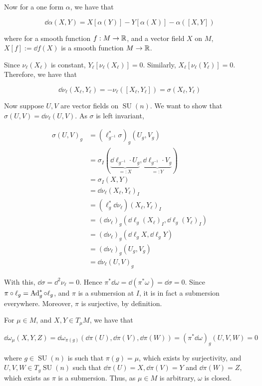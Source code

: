 \documentclass{article}
\DeclareMathOperator{\SU}{SU}
\begin{document}
Now for a one form \(\alpha\), we have that

\[\dd\alpha(X, Y) = X[\alpha(Y)] - Y[\alpha(X)] - \alpha([X, Y])\]

where for a smooth function \(f : M \to \mathbb{R}\), and a vector field \(X\) on \(M\), \(X[f] := \dd f(X)\) is a smooth function \(M \to \mathbb{R}\).

Since \(\nu_\ell(X_\ell)\) is constant, \(Y_\ell[\nu_\ell(X_\ell)] = 0\). Similarly, \(X_\ell[\nu_\ell(Y_\ell)] = 0\). Therefore, we have that

\[\dd \nu_\ell(X_\ell, Y_\ell) = -\nu_\ell([X_\ell, Y_\ell]) = \sigma(X_\ell, Y_\ell)\]

Now suppose \(U, V\) are vector fields on \(\SU(n)\). We want to show that \(\sigma(U, V) = \dd\nu_\ell(U, V)\). As \(\sigma\) is left invariant,

\begin{align*}
    \sigma(U, V)_g &= (\ell_{g^{-1}}^* \sigma)_g(U_g, V_g) \\
    &= \sigma_I(\underbrace{\dd \ell_{g^{-1}} \cdot U_g}_{=:X}, \underbrace{\dd \ell_{g^{-1}} \cdot V_g}_{=:Y}) \\
    &= \sigma_I(X, Y) \\
    &= \dd\nu_\ell(X_\ell, Y_\ell)_I \\
    &= (\ell_g^*\dd\nu_\ell)(X_\ell, Y_\ell)_I \\
    &= (\dd\nu_\ell)_g(\dd\ell_g(X_\ell)_I, \dd\ell_g(Y_\ell)_I) \\
    &= (\dd\nu_\ell)_g(\dd \ell_g X, \dd\ell_g Y) \\
    &= (\dd\nu_\ell)_g(U_g, V_g) \\
    &= \dd\nu_\ell(U, V)_g
\end{align*}

With this, \(\dd\sigma = \dd^2\nu_\ell = 0\). Hence \(\pi^*\dd\omega = \dd(\pi^*\omega) = \dd\sigma = 0\). Since \(\pi \circ \ell_g = \operatorname{Ad}_g^* \circ \ell_g\), and \(\pi\) is a submersion at \(I\), it is in fact a submersion everywhere. Moreover, \(\pi\) is surjective, by definition.

For \(\mu \in  M\), and \(X, Y \in T_\mu  M\), we have that

\[\dd\omega_\mu(X, Y, Z) = \dd\omega_{\pi(g)}(\dd\pi(U), \dd\pi(V), \dd\pi(W)) = (\pi^*\dd\omega)_g(U, V, W) = 0\]

where \(g \in \SU(n)\) is such that \(\pi(g) = \mu\), which exists by surjectivity, and \(U, V, W \in T_g\SU(n)\) such that \(\dd\pi(U) = X, \dd\pi(V) = Y\) and \(\dd\pi(W) = Z\), which exists as \(\pi\) is a submersion. Thus, as \(\mu \in  M\) is arbitrary, \(\omega\) is closed.
\end{document}
